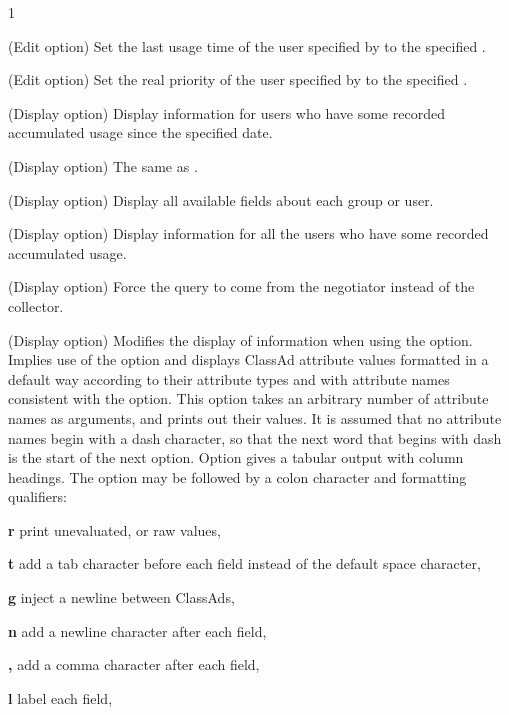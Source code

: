 \begin{ManPage}{\label{man-condor-userprio}}{1}
\begin{Options}
  {(Edit option) Set the last usage time of the user specified by
   to the specified .  }

  {(Edit option) Set the real priority of the user specified by
   to the specified .  }

  {(Display option) Display information for users who have 
  some recorded accumulated usage since the specified date.  }

 {
  (Display option) The same as . }

  {(Display option) Display all available fields about each group or user.}

  {(Display option) Display information for all the users 
  who have some recorded accumulated usage.}

  {(Display option) Force the query to come from the negotiator
   instead of the collector.}

 {
  (Display option) Modifies the display of information when using the 
   option. 
  Implies use of the  option and displays ClassAd attribute 
  values formatted in a default way according to their attribute types  
  and with attribute names consistent with the  option.
  This option takes an arbitrary number of attribute names as arguments,
  and prints out their values.
  It is assumed that no attribute names begin with a dash character,
  so that the next word that begins with dash is the 
  start of the next option.
  Option  gives a tabular output with column headings.
  The  option may be followed by a colon character
  and formatting qualifiers:

  \textbf{r} print unevaluated, or raw values,

  \textbf{t} add a tab character before each field instead of 
  the default space character,

  \textbf{g} inject a newline between ClassAds,

  \textbf{n} add a newline character after each field,

  \textbf{,} add a comma character after each field,

  \textbf{l} label each field,

}
\end{Options}
\end{ManPage}
